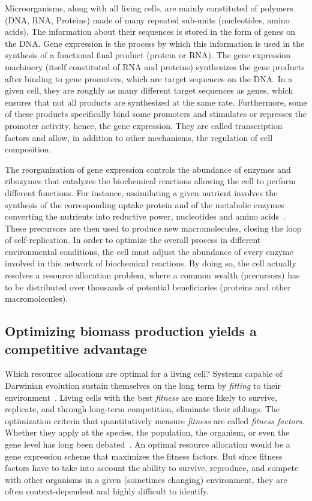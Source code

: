 Microorganisms, along with all living cells, are mainly constituted of polymers (DNA, RNA, Proteins) made of many repeated sub-units (nucleotides, amino acids).
The information about their sequences is stored in the form of genes on the DNA.
Gene expression is the process by which this information is used in the synthesis of a functional final product (protein or RNA).
The gene expression machinery (itself constituted of RNA and proteins) synthesizes the gene products after binding to gene promoters, which are target sequences on the DNA.
In a given cell, they are roughly as many different target sequences as genes, which ensures that not all products are synthesized at the same rate.
Furthermore, some of these products specifically bind some promoters and stimulates or represses the promoter activity, hence, the gene expression.
They are called transcription factors and allow, in addition to other mechanisms, the regulation of cell composition.

The reorganization of gene expression controls the abundance of enzymes and ribozymes that catalyzes the biochemical reactions allowing the cell to perform different functions.
For instance, assimilating a given nutrient involves the synthesis of the corresponding uptake protein and of the metabolic enzymes converting the nutrients into reductive power, nucleotides and amino acids~\cite{schaechter_microbe_2006}.
These precursors are then used to produce new macromolecules, closing the loop of self-replication.
In order to optimize the overall process in different environmental conditions, the cell must adjust the abundance of every enzyme involved in this network of biochemical reactions.
By doing so, the cell actually resolves a resource allocation problem, where a common wealth (precursors) has to be distributed over thousands of potential beneficiaries (proteins and other macromolecules).

\subsection{Optimizing biomass production yields a competitive advantage}

Which resource allocations are optimal for a living cell?
Systems capable of Darwinian evolution sustain themselves on the long term by \textit{fitting} to their environment~\cite{dawkins_selfish_1976}.
Living cells with the best \textit{fitness} are more likely to survive, replicate, and through long-term competition, eliminate their siblings.
The optimization criteria that quantitatively measure \textit{fitness} are called \textit{fitness factors}.
Whether they apply at the species, the population, the organism, or even the gene level has long been debated~\cite{dawkins_selfish_1976}.
An optimal resource allocation would be a gene expression scheme that maximizes the fitness factors.
But since fitness factors have to take into account the ability to survive, reproduce, and compete with other organisms in a given (sometimes changing) environment, they are often context-dependent and highly difficult to identify.

